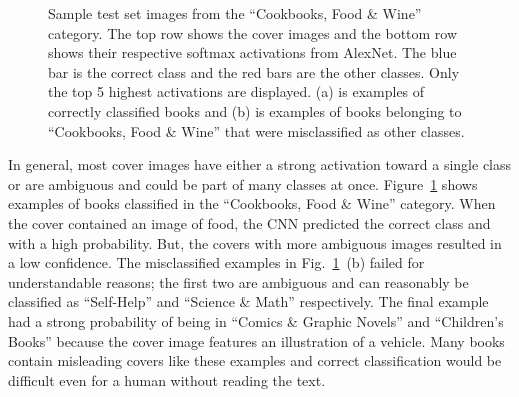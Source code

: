 \documentclass[conference]{IEEEtran}
\begin{document}
\begin{figure}
\begin{center}
\setlength\fboxsep{0pt}
\setlength\fboxrule{0pt}
\framebox[0.024\columnwidth]{ }
\end{center}
\begin{center}
\setlength\fboxsep{0pt}
\setlength\fboxrule{0pt}
\framebox[0.024\columnwidth]{ }
\end{center}
\begin{center}
\setlength\fboxsep{1pt}
\setlength\fboxrule{0pt}
\framebox[0.024\columnwidth]{ }
\end{center}
\caption{\label{food} Sample test set images from the ``Cookbooks, Food \& Wine'' category. The top row shows the cover images and the bottom row shows their respective softmax activations from AlexNet. The blue bar is the correct class and the red bars are the other classes. Only the top 5 highest activations are displayed. (a) is examples of correctly classified books and (b) is examples of books belonging to ``Cookbooks, Food \& Wine'' that were misclassified as other classes.  }
\end{figure}

In general, most cover images have either a strong activation toward a single class or are ambiguous and could be part of many classes at once. 
Figure~\ref{food} shows examples of books classified in the ``Cookbooks, Food \& Wine'' category. 
When the cover contained an image of food, the CNN predicted the correct class and with a high probability.
But, the covers with more ambiguous images resulted in a low confidence.
The misclassified examples in Fig.~\ref{food}~(b) failed for understandable reasons;
the first two are ambiguous and can reasonably be classified as ``Self-Help'' and ``Science \& Math'' respectively. 
The final example had a strong probability of being in ``Comics \& Graphic Novels'' and ``Children's Books'' because the cover image features an illustration of a vehicle.
Many books contain misleading covers like these examples and correct classification would be difficult even for a human without reading the text.
\end{document}
